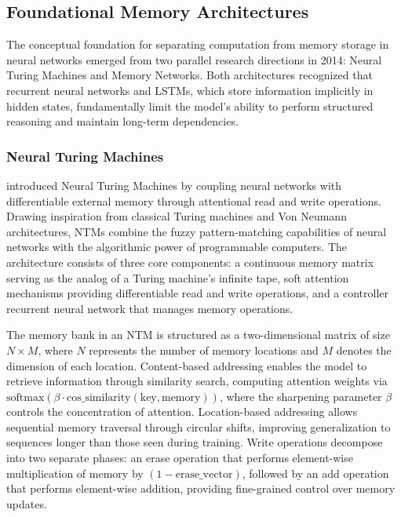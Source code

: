 \subsection{Foundational Memory Architectures}

The conceptual foundation for separating computation from memory storage in neural networks emerged from two parallel research directions in 2014: Neural Turing Machines and Memory Networks. Both architectures recognized that recurrent neural networks and LSTMs, which store information implicitly in hidden states, fundamentally limit the model's ability to perform structured reasoning and maintain long-term dependencies.

\subsubsection{Neural Turing Machines}

\citet{graves2014neural} introduced Neural Turing Machines by coupling neural networks with differentiable external memory through attentional read and write operations. Drawing inspiration from classical Turing machines and Von Neumann architectures, NTMs combine the fuzzy pattern-matching capabilities of neural networks with the algorithmic power of programmable computers. The architecture consists of three core components: a continuous memory matrix serving as the analog of a Turing machine's infinite tape, soft attention mechanisms providing differentiable read and write operations, and a controller recurrent neural network that manages memory operations.

The memory bank in an NTM is structured as a two-dimensional matrix of size $N \times M$, where $N$ represents the number of memory locations and $M$ denotes the dimension of each location. Content-based addressing enables the model to retrieve information through similarity search, computing attention weights via $\text{softmax}(\beta \cdot \text{cos\_similarity}(\text{key}, \text{memory}))$, where the sharpening parameter $\beta$ controls the concentration of attention. Location-based addressing allows sequential memory traversal through circular shifts, improving generalization to sequences longer than those seen during training. Write operations decompose into two separate phases: an erase operation that performs element-wise multiplication of memory by $(1 - \text{erase\_vector})$, followed by an add operation that performs element-wise addition, providing fine-grained control over memory updates.

